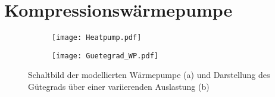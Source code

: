\section{Kompressionswärmepumpe}\label{section: Modellbildung - Kompressionswärmepumpe}
	\begin{figure}
		\begin{subfigure}[b]{0.48\textwidth}
			\texttt{[image: Heatpump.pdf]}
			\label{subfigure: Schaltbild_Heatpump}
		\end{subfigure}
		\hfill
		\begin{subfigure}[b]{0.48\textwidth}
			\texttt{[image: Guetegrad\_WP.pdf]}
			\subcaption{}
			\label{subfigure: Guetegrad_WP}
		\end{subfigure}
		\caption[Konzeptionelle Darstellung zweier Ansätze zur Steigerung der Speicherkapazität durch Verwendung einer Wärmepumpe]{Schaltbild der modellierten Wärmepumpe (a) und Darstellung des Gütegrads über einer variierenden Auslastung (b)}
		\label{fig: HP - Schaltplan und Guetegrad}
	\end{figure}

